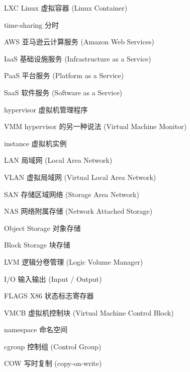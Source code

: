 \begin{denotation}[3cm]
\item[LXC] Linux 虚拟容器 (Linux Container)
\item[time-sharing] 分时
\item[AWS] 亚马逊云计算服务 (Amazon Web Services)
\item[IaaS] 基础设施服务 (Infrastructure as a Service)
\item[PaaS] 平台服务 (Platform as a Service)
\item[SaaS] 软件服务 (Software as a Service)
\item[hypervisor] 虚拟机管理程序
\item[VMM] hypervisor 的另一种说法 (Virtual Machine Monitor)
\item[instance] 虚拟机实例
\item[LAN] 局域网 (Local Area Network)
\item[VLAN] 虚拟局域网 (Virtual Local Area Network)
\item[SAN] 存储区域网络 (Storage Area Network)
\item[NAS] 网络附属存储 (Network Attached Storage)
\item[Object Storage] 对象存储
\item[Block Storage] 块存储
\item[LVM] 逻辑分卷管理 (Logic Volume Manager)
\item[I/O] 输入输出 (Input / Output)
\item[FLAGS] X86 状态标志寄存器
\item[VMCB] 虚拟机控制块 (Virtual Machine Control Block)
\item[namespace] 命名空间
\item[cgroup] 控制组 (Control Group)
\item[COW] 写时复制 (copy-on-write)
\end{denotation}
